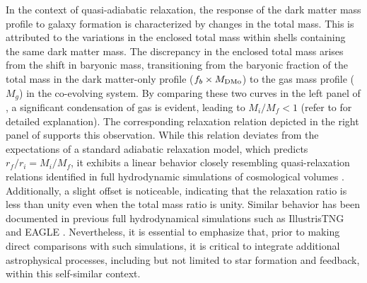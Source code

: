 In the context of quasi-adiabatic relaxation, the response of the dark matter mass profile to galaxy formation is characterized by changes in the total mass. This is attributed to the variations in the enclosed total mass within shells containing the same dark matter mass. The discrepancy in the enclosed total mass arises from the shift in baryonic mass, transitioning from the baryonic fraction of the total mass in the dark matter-only profile ($f_b \times M_{\rm DMo}$) to the gas mass profile ($M_g$) in the co-evolving system. By comparing these two curves in the left panel of , a significant condensation of gas is evident, leading to $M_i/M_f < 1$ (refer to  for detailed explanation). The corresponding relaxation relation depicted in the right panel of  supports this observation. While this relation deviates from the expectations of a standard adiabatic relaxation model, which predicts $r_f/r_i = M_i/M_f$, it exhibits a linear behavior closely resembling quasi-relaxation relations identified in full hydrodynamic simulations of cosmological volumes \cite{2023Velmani&Paranjape}. Additionally, a slight offset is noticeable, indicating that the relaxation ratio is less than unity even when the total mass ratio is unity. Similar behavior has been documented in previous full hydrodynamical simulations such as IllustrisTNG and EAGLE \cite{2023Velmani&Paranjape}. Nevertheless, it is essential to emphasize that, prior to making direct comparisons with such simulations, it is critical to integrate additional astrophysical processes, including but not limited to star formation and feedback, within this self-similar context.

